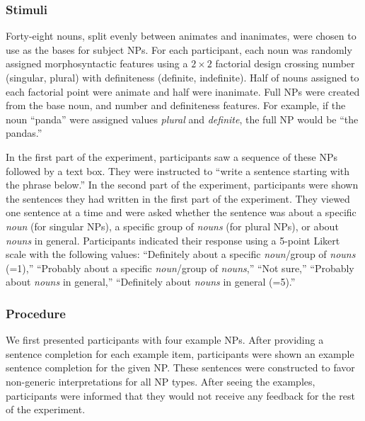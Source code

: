 \documentclass[10pt,letterpaper]{article}
\begin{document}
\subsubsection{Stimuli}

Forty-eight nouns, split evenly between animates and inanimates, were chosen to use as the bases for subject NPs. For each participant, each noun was randomly assigned morphosyntactic features using a \(2 \times 2\) factorial design crossing number (singular, plural) with definiteness (definite, indefinite). Half of nouns assigned to each factorial point were animate and half were inanimate. Full NPs were created from the base noun, and number and definiteness features. For example, if the noun ``panda'' were assigned values \textit{plural} and \textit{definite}, the full NP would be ``the pandas.''

In the first part of the experiment, participants saw a sequence of these NPs followed by a text box. They were instructed to ``write a sentence starting with the phrase below.'' In the second part of the experiment, participants were shown the sentences they had written in the first part of the experiment. They viewed one sentence at a time and were asked whether the sentence was about a specific \textit{noun} (for singular NPs), a specific group of \textit{nouns} (for plural NPs), or about \textit{nouns} in general. Participants indicated their response using a 5-point Likert scale with the following values: ``Definitely about a specific \textit{noun}/group of \textit{nouns} (=1),'' ``Probably about a specific \textit{noun}/group of \textit{nouns},'' ``Not sure,'' ``Probably about \textit{nouns} in general,'' ``Definitely about \textit{nouns} in general (=5).''

\subsubsection{Procedure}

We first presented participants with four example NPs. After providing a sentence completion for each example item, participants were shown an example sentence completion for the given NP. These sentences were constructed to favor non-generic interpretations for all NP types. After seeing the examples, participants were informed that they would not receive any feedback for the rest of the experiment.
\end{document}
